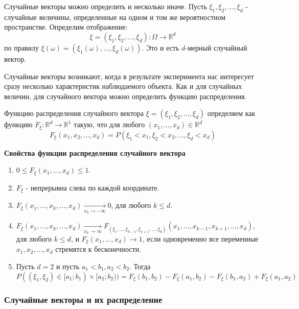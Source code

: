 Случайные векторы можно определить и несколько иначе. Пусть $\xi_1, \xi_2, \dots, \xi_d$ - случайные величины, определенные на одном и том же вероятностном пространстве. Определим отображение:
\[ \xi = (\xi_1, \xi_2, \dots, \xi_d) : \Omega \to \mathbb{R}^d \]
по правилу $\xi (\omega) = (\xi_1(\omega), \dots, \xi_d (\omega))$. Это и есть $d$-мерный случайный вектор.

Случайные векторы возникают, когда в результате эксперимента нас интересует сразу несколько характеристик наблюдаемого объекта. Как и для случайных величин, для случайного вектора можно определить функцию распределения.

\begin{definition}
	Функцию распределения случайного вектора $\xi = (\xi_1, \xi_2, \dots, \xi_d)$ определяем как функцию $F_{\xi}: \mathbb{R}^d \to \mathbb{R}^1$ такую, что для любого $(x_1, \dots, x_d) \in \mathbb{R}^d$
	\[ F_{\xi} (x_1, x_2, \dots, x_d) = P(\xi_1 < x_1, \xi_2 < x_2, \dots, \xi_d < x_d) \]
\end{definition}

\begin{center}
	\textbf{Свойства функции распределения случайного вектора}
\end{center}
\begin{enumerate}
	\item $0 \le F_{\xi} (x_1, \dots, x_d) \le 1$.
	\item $F_{\xi}$ - непрерывна слева по каждой координате.
	\item $F_{\xi} (x_1, \dots, x_k, \dots, x_d) \underset{x_k \to - \infty}{\to} 0$, для любого $k \le d$.
	\item $F_{\xi} (x_1, \dots, x_k, \dots, x_d) \underset{x_k \to \infty}{\to} F_{(\xi_1, \dots, \xi_{k-1}, \xi_{x+1}, \dots, \xi_d)} (x_1, \dots, x_{k-1}, x_{k+1}, \dots, x_d)$, для любого $k \le d$, и $F_{\xi} (x_1, \dots, x_d) \to 1$, если одновременно все переменные $x_1, x_2, \dots, x_d$ стремятся к бесконечности.
	\item Пусть $d=2$ и пусть $a_1 < b_1, a_2 < b_2$. Тогда
	\[ P( (\xi_1, \xi_2) \in [a_1;b_1) \times [a_2;b_2) ) = F_{\xi} (b_1, b_2) - F_{\xi} (a_1, b_2) - F_{\xi} (b_1, a_2) + F_{\xi} (a_1, a_2) \]
\end{enumerate}

\subsubsection{Случайные векторы и их распределение}

